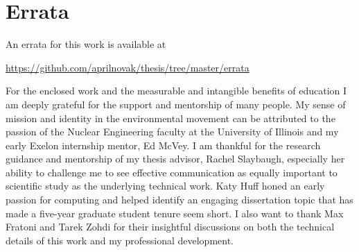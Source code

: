 \documentclass{ucbthesis}
\begin{document}
\begin{frontmatter}

\begin{comment}
\begin{dedication}
\null\vfil
\begin{center}
To my family and friends\\\vspace{12pt}
\end{center}
\vfil\null
\end{dedication}
\end{comment}


\clearpage
\begin{KeepFromToc}
\tableofcontents
\end{KeepFromToc}
\clearpage

\clearpage
\printglossary[style=mystyle]

\clearpage


\clearpage


\clearpage
\chapter*{Errata}

An errata for this work is available at

\begin{center}
\url{https://github.com/aprilnovak/thesis/tree/master/errata}
\end{center}


\begin{acknowledgements}
For the enclosed work and the measurable and intangible benefits of education I am deeply grateful for the support and mentorship of many people. My sense of mission and identity in the environmental movement can be attributed to the passion of the Nuclear Engineering faculty at the University of Illinois and my early Exelon internship mentor, Ed McVey. I am thankful for the research guidance and mentorship of my thesis advisor, Rachel Slaybaugh, especially her ability to challenge me to see effective communication as equally important to scientific study as the underlying technical work. Katy Huff honed an early passion for computing and helped identify an engaging dissertation topic that has made a five-year graduate student tenure seem short. I also want to thank Max Fratoni and Tarek Zohdi for their insightful discussions on both the technical details of this work and my professional development.


\end{acknowledgements}
\end{frontmatter}
\end{document}
